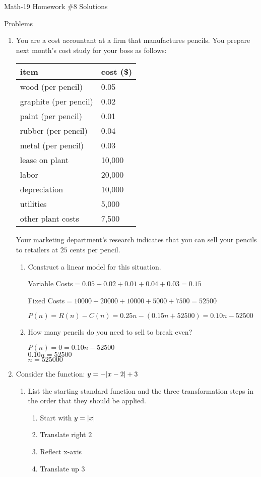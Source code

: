 \documentclass[letterpaper,12pt,fleqn]{article}
\begin{document}
\begin{center}
\Large Math-19 Homework \#8 Solutions
\end{center}

\underline{Problems}

\begin{enumerate}
\item You are a cost accountant at a firm that manufactures pencils. You
  prepare next month's cost study for your boss as follows:

  \begin{tabular}{|l|l|}
    \hline
    item & cost (\$) \\
    \hline
    wood (per pencil) & 0.05 \\
    graphite (per pencil) & 0.02 \\
    paint (per pencil) & 0.01 \\
    rubber (per pencil) & 0.04 \\
    metal (per pencil) & 0.03 \\
    lease on plant & 10,000 \\
    labor & 20,000 \\
    depreciation & 10,000 \\
    utilities & 5,000 \\
    other plant costs & 7,500 \\
    \hline
  \end{tabular}

  Your marketing department's research indicates that you can sell your pencils
  to retailers at $25$ cents per pencil.
  \begin{enumerate}
  \item Construct a linear model for this situation.

    Variable Costs$=0.05+0.02+0.01+0.04+0.03=0.15$

    Fixed Costs$=10000+20000+10000+5000+7500=52500$

    $P(n)=R(n)-C(n)=0.25n-(0.15n+52500)=0.10n-52500$
    
  \item How many pencils do you need to sell to break even?

    $P(n)=0=0.10n-52500$ \\
    $0.10n=52500$ \\
    $n=525000$
  \end{enumerate}

\item Consider the function: $y=-\lvert x-2\rvert+3$
  \begin{enumerate}
  \item List the starting standard function and the three transformation
    steps in the order that they should be applied.
    \begin{enumerate}
    \item Start with $y=\lvert x\rvert$
    \item Translate right $2$
    \item Reflect x-axis
    \item Translate up 3
    \end{enumerate}


\end{enumerate}
\end{enumerate}
\end{document}
